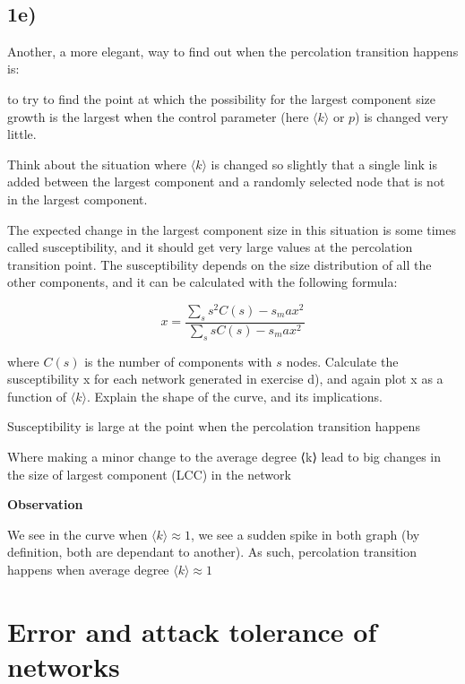 \documentclass[11pt]{article}
\begin{document}
    \begin{center}
    \end{center}
    { \hspace*{\fill} \\}
    
    \subsection{1e)}\label{e}

Another, a more elegant, way to find out when the percolation transition
happens is:

to try to find the point at which the possibility for the largest
component size growth is the largest when the control parameter (here
\(\langle k \rangle\) or \(p\)) is changed very little.

Think about the situation where \(\langle k \rangle\) is changed so
slightly that a single link is added between the largest component and a
randomly selected node that is not in the largest component.

The expected change in the largest component size in this situation is
some times called susceptibility, and it should get very large values at
the percolation transition point. The susceptibility depends on the size
distribution of all the other components, and it can be calculated with
the following formula:

\[x = \frac{\sum_s s^2 C(s) - s_max^2}{\sum_s s C(s) - s_max^2}\]

where \(C(s)\) is the number of components with \(s\) nodes. Calculate
the susceptibility x for each network generated in exercise d), and
again plot x as a function of \(\langle k \rangle\). Explain the shape
of the curve, and its implications.

    Susceptibility is large at the point when the percolation transition
happens

Where making a minor change to the average degree ⟨k⟩ lead to big
changes in the size of largest component (LCC) in the network

\textbf{Observation}

We see in the curve when \(⟨k⟩ \approx 1\), we see a sudden spike in
both graph (by definition, both are dependant to another). As such,
percolation transition happens when average degree \(⟨k⟩ \approx 1\)

    \section{Error and attack tolerance of
networks}\label{error-and-attack-tolerance-of-networks}
\end{document}
